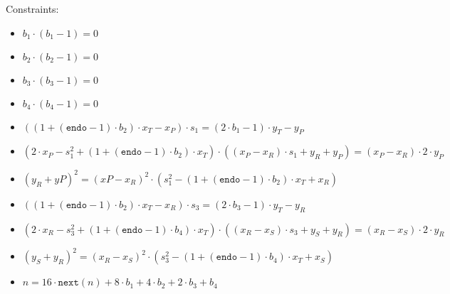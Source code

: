 Constraints:
\begin{itemize}
	\item $b_1 \cdot (b_1 - 1) = 0$
	\item $b_2 \cdot (b_2 - 1) = 0$
	\item $b_3 \cdot (b_3 - 1) = 0$
	\item $b_4 \cdot (b_4 - 1) = 0$
	\item $((1 + (\texttt{endo} - 1) \cdot b_2) \cdot x_T - x_P) \cdot s_1 = (2 \cdot b_1 - 1) \cdot y_T - y_P$
	\item $(2 \cdot x_P - s_1^2 + (1 + (\texttt{endo} - 1) \cdot b_2) \cdot x_T) \cdot ((x_P - x_R) \cdot s_1 + y_R + y_P) = (x_P - x_R) \cdot 2 \cdot y_P$
	\item $(y_R + yP)^2 = (xP - x_R)^2 \cdot (s_1^2 - (1 + (\texttt{endo} - 1) \cdot b_2) \cdot x_T + x_R)$
	\item $((1 + (\texttt{endo} - 1) \cdot b_2) \cdot x_T - x_R) \cdot s_3 = (2 \cdot b_3-1) \cdot y_T - y_R$
	\item $(2 \cdot x_R - s_3^2 + (1 + (\texttt{endo} - 1) \cdot b_4) \cdot x_T) \cdot ((x_R - x_S) \cdot s_3 + y_S + y_R) = (x_R - x_S) \cdot 2 \cdot y_R$
	\item $(y_S + y_R)^2 = (x_R - x_S)^2 \cdot (s_3^2 - (1 + (\texttt{endo} - 1) \cdot b_4) \cdot x_T + x_S)$
	\item $n = 16 \cdot \texttt{next}(n) + 8 \cdot b_1 + 4 \cdot b_2 + 2 \cdot b_3 + b_4$
\end{itemize}
